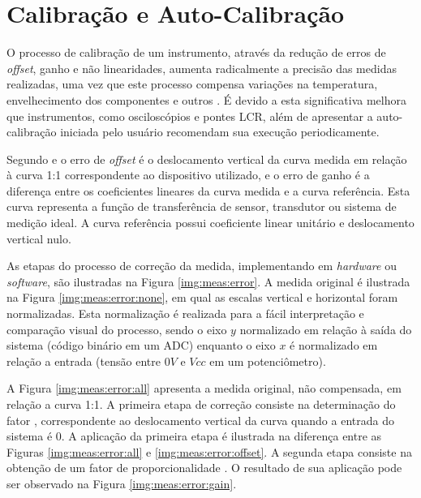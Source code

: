 	\section{Calibração e Auto-Calibração}\label{sec:revbib:calibration}

		O processo de calibração de um instrumento, através da redução de erros de \textit{offset}, ganho e não linearidades, aumenta radicalmente a precisão das medidas realizadas, uma vez que este processo compensa variações na temperatura, envelhecimento dos componentes e outros \cite[][p.5]{spoonkillervideo}. É devido a esta significativa melhora que instrumentos, como osciloscópios e pontes LCR, além de apresentar a auto-calibração iniciada pelo usuário recomendam sua execução periodicamente.

		Segundo \textcite{spoonkillervideo} e \textcite{spoonkillervideo} o erro de \textit{offset} é o deslocamento vertical da curva medida em relação à curva 1:1 correspondente ao dispositivo utilizado, e o erro de ganho é a diferença entre os coeficientes lineares da curva medida e a curva referência. Esta curva representa a função de transferência de sensor, transdutor ou sistema de medição ideal. A curva referência possui coeficiente linear unitário e deslocamento vertical nulo.

		As etapas do processo de correção da medida, implementando em \textit{hardware} ou \textit{software}, são ilustradas na Figura \ref{img:meas:error}. A medida original é ilustrada na Figura \ref{img:meas:error:none}, em qual as escalas vertical e horizontal foram normalizadas. Esta normalização é realizada para a fácil interpretação e comparação visual do processo, sendo o eixo $y$ normalizado em relação à saída do sistema (código binário em um ADC) enquanto o eixo $x$ é normalizado em relação a entrada (tensão entre $0 V$ e $Vcc$ em um potenciômetro).

		A Figura \ref{img:meas:error:all} apresenta a medida original, não compensada, em relação a curva 1:1. A primeira etapa de correção consiste na determinação do fator , correspondente ao deslocamento vertical da curva quando a entrada do sistema é 0. A aplicação da primeira etapa é ilustrada na diferença entre as Figuras \ref{img:meas:error:all} e \ref{img:meas:error:offset}. A segunda etapa consiste na obtenção de um fator de proporcionalidade . O resultado de sua aplicação pode ser observado na Figura \ref{img:meas:error:gain}.


